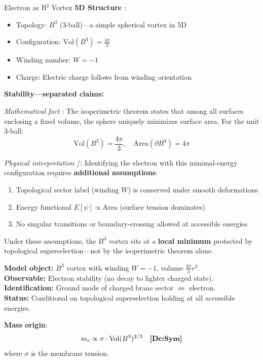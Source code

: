 \begin{mechanism}{Electron as B$^3$ Vortex}
\textbf{5D Structure} \tagP{}:
\begin{itemize}[nosep]
\item Topology: $B^3$ (3-ball)---a simple spherical vortex in 5D
\item Configuration: $\text{Vol}(B^3) = \frac{4\pi}{3}$
\item Winding number: $W = -1$
\item Charge: Electric charge follows from winding orientation
\end{itemize}

\textbf{Stability---separated claims:}

\textit{Mathematical fact} \tagM{}:
The isoperimetric theorem states that among all surfaces enclosing a fixed volume,
the sphere uniquely minimizes surface area. For the unit 3-ball:
\begin{equation}
\text{Vol}(B^3) = \frac{4\pi}{3}, \quad \text{Area}(\partial B^3) = 4\pi
\end{equation}

\textit{Physical interpretation} \tagI{}/\tagP{}:
Identifying the electron with this minimal-energy configuration requires
\textbf{additional assumptions}:
\begin{enumerate}[nosep]
\item Topological sector label (winding $W$) is conserved under smooth deformations
\item Energy functional $E[\psi] \propto \text{Area}$ (surface tension dominates)
\item No singular transitions or boundary-crossing allowed at accessible energies
\end{enumerate}
Under these assumptions, the $B^3$ vortex sits at a \textbf{local minimum}
protected by topological superselection---not by the isoperimetric theorem alone.

\begin{tcolorbox}[colback=yellow!5, colframe=yellow!50!black,
  title=\textbf{Dictionary: Geometry $\to$ Electron Stability}]
\tagDc{}
\textbf{Model object:} $B^3$ vortex with winding $W = -1$, volume $\frac{4\pi}{3}r^3$.\\
\textbf{Observable:} Electron stability (no decay to lighter charged state).\\
\textbf{Identification:} Ground mode of charged brane sector $\Leftrightarrow$ electron.\\
\textbf{Status:} Conditional on topological superselection holding at all accessible energies.
\end{tcolorbox}

\textbf{Mass origin}:
\begin{equation}
m_e \propto \sigma \cdot \text{Vol}(B^3)^{2/3} \quad \textbf{[Dc:Sym]}
\end{equation}
where $\sigma$ is the membrane tension.
\end{mechanism}

